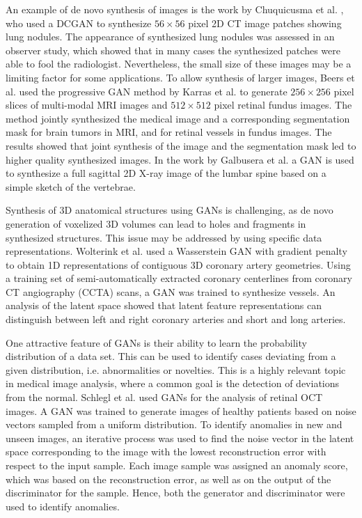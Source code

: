 \documentclass{article}
\begin{document}
An example of de novo synthesis of images is the work by Chuquicusma et al. \cite{Chuq17}, who used a DCGAN to synthesize $56\times 56$ pixel 2D CT image patches showing lung nodules. The appearance of synthesized lung nodules was assessed in an observer study, which showed that in many cases the synthesized patches were able to fool the radiologist. Nevertheless, the small size of these images may be a limiting factor for some applications. To allow synthesis of larger images, Beers et al. \cite{Beer18} used the progressive GAN method by Karras et al. \cite{Karr17} to generate $256\times 256$ pixel slices of multi-modal MRI images and $512\times 512$ pixel retinal fundus images. The method jointly synthesized the medical image and a corresponding segmentation mask for brain tumors in MRI, and for retinal vessels in fundus images. The results showed that joint synthesis of the image and the segmentation mask led to higher quality synthesized images. In the work by Galbusera et al. \cite{Galb18} a GAN is used to synthesize a full sagittal 2D X-ray image of the lumbar spine based on a simple sketch of the vertebrae. 

Synthesis of 3D anatomical structures using GANs is challenging, as de novo generation of voxelized 3D volumes can lead to holes and fragments in synthesized structures. This issue may be addressed by using specific data representations. Wolterink et al. \cite{Wolt18} used a Wasserstein GAN with gradient penalty to obtain 1D representations of contiguous 3D coronary artery geometries. Using  a training set of semi-automatically extracted coronary centerlines from coronary CT angiography (CCTA) scans, a GAN was trained to synthesize vessels. An analysis of the latent space showed that latent feature representations can distinguish between left and right coronary arteries and short and long arteries.

One attractive feature of GANs is their ability to learn the probability distribution of a data set. This can be used to identify cases deviating from a given distribution, i.e. abnormalities or novelties. This is a highly relevant topic in medical image analysis, where a common goal is the detection of deviations from the normal. Schlegl et al. \cite{Schl17} used GANs for the analysis of retinal OCT images. A GAN was trained to generate images of healthy patients based on noise vectors sampled from a uniform distribution. To identify anomalies in new and unseen images, an iterative process was used to find the noise vector in the latent space corresponding to the image with the lowest reconstruction error with respect to the input sample. Each image sample was assigned an anomaly score, which was based on the reconstruction error, as well as on the output of the discriminator for the sample. Hence, both the generator and discriminator were used to identify anomalies.  
\end{document}
